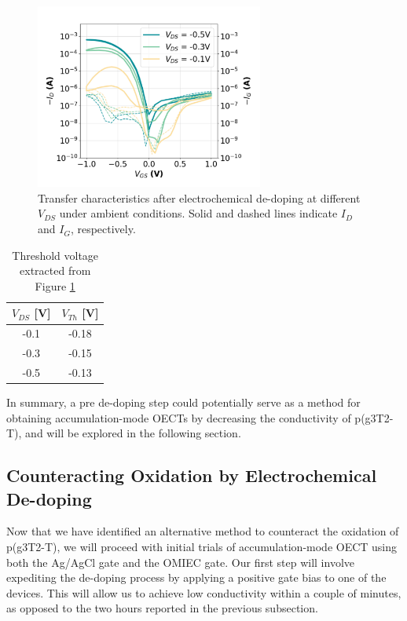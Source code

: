 \begin{figure}[ht]
    \centering
    \includegraphics[width=7.5cm]{Images/pdf/revox_transfer_loop2.pdf}%
    \caption[Transfer characteristics after electrochemical de-doping]{Transfer characteristics after electrochemical de-doping at different $V_{DS}$ under ambient conditions. Solid and dashed lines indicate $I_{D}$ and $I_{G}$, respectively.}
    \label{fig:transrevox1}
\end{figure}

\begin{table}[ht]
\centering
\caption{Threshold voltage extracted from Figure \ref{fig:transrevox1}}
\begin{tabular}{c|c}
 $V_{DS}$ [V] & $V_{Th}$ [V] \\\hline
-0.1 & -0.18 \\
-0.3 & -0.15 \\
-0.5 & -0.13 \\ \hline
\end{tabular}
\label{tab:vth_air}
\end{table}

In summary, a pre de-doping step could potentially serve as a method for obtaining accumulation-mode OECTs by decreasing the conductivity of p(g3T2-T), and will be explored in the following section.

\subsection{Counteracting Oxidation by Electrochemical De-doping} \label{subsec:revox}
Now that we have identified an alternative method to counteract the oxidation of p(g3T2-T), we will proceed with initial trials of accumulation-mode OECT using both the Ag/AgCl gate and the OMIEC gate. Our first step will involve expediting the de-doping process by applying a positive gate bias to one of the devices. This will allow us to achieve low conductivity within a couple of minutes, as opposed to the two hours reported in the previous subsection. 

